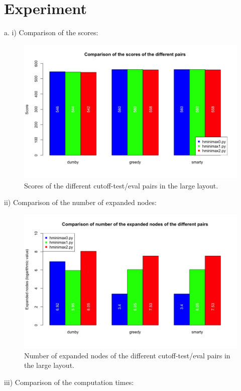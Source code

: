 \documentclass{article}
\begin{document}
\section{Experiment}
a.
	i) Comparison of the scores:
		\begin{figure}[H]
			\centering
			\includegraphics[scale=0.45]{plots/3a_scores.png}
			\caption{Scores of the different cutoff-test/eval pairs in the large layout.}
		\end{figure}
	ii) Comparison of the number of expanded nodes:
		\begin{figure}[H]
			\centering
			\includegraphics[scale=0.45]{plots/3a_nodes.png} 
			\caption{Number of expanded nodes of the different cutoff-test/eval pairs in the large layout.}
		\end{figure}
	iii) Comparison of the computation times:
\end{document}
